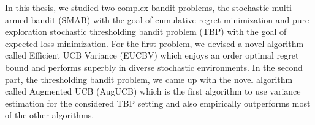 In this thesis, we studied two complex bandit problems, the stochastic multi-armed bandit (SMAB) with the goal of cumulative regret minimization and pure exploration stochastic thresholding bandit problem (TBP) with the goal of expected loss minimization. For the first problem, we devised a novel algorithm called Efficient UCB Variance (EUCBV) which enjoys an order optimal regret bound and performs superbly in diverse stochastic environments. In the second part, the thresholding bandit problem, we came up with the novel algorithm called Augmented UCB (AugUCB) which is the first algorithm to use variance estimation for the considered TBP setting and also empirically outperforms most of the other algorithms. 


    


